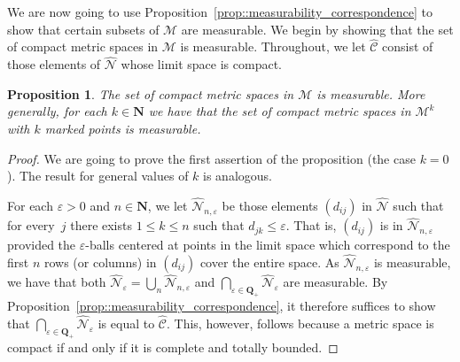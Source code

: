 \documentclass[10pt]{amsart}
\let\mathcal\mathscr
\let\epsilon\varepsilon
\theoremstyle{plain}
\numberwithin{theorem}{section}
\newtheorem{proposition}[theorem]{Proposition}
\theoremstyle{definition}
\newcommand\mmspace{{\mathcal M}}
\newcommand{\matrixmspace}{\mathcal N}
\newcommand{\compactmatrix}{\mathcal C}
\newcommand{\N}{\mathbf{N}}
\newcommand{\Q}{{\mathbf Q}}
\let\wh\widehat
\begin{document}
We are now going to use Proposition~\ref{prop::measurability_correspondence} to show that certain subsets of $\mmspace$ are measurable. We begin by showing that the set of compact metric spaces in $\mmspace$ is measurable. Throughout, we let $\wh{\compactmatrix}$ consist of those elements of $\wh{\matrixmspace}$ whose limit space is compact.

\begin{proposition}
\label{prop::compact_measurable}
The set of compact metric spaces in $\mmspace$ is measurable. More generally, for each $k \in \N$ we have that the set of compact metric spaces in $\mmspace^k$ with $k$ marked points is measurable.
\end{proposition}
\begin{proof}
We are going to prove the first assertion of the proposition (\ie the case $k=0$). The result for general values of $k$ is analogous.

For each $\epsilon > 0$ and $n \in \N$, we let $\wh{\matrixmspace}_{n,\epsilon}$ be those elements $(d_{ij})$ in $\wh{\matrixmspace}$ such that for every~$j$ there exists $1 \leq k \leq n$ such that $d_{jk} \leq \epsilon$. That is, $(d_{ij})$ is in $\wh{\matrixmspace}_{n,\epsilon}$ provided the $\epsilon$-balls centered at points in the limit space which correspond to the first $n$ rows (or columns) in $(d_{ij})$ cover the entire space. As $\wh{\matrixmspace}_{n,\epsilon}$ is measurable, we have that both $\wh{\matrixmspace}_\epsilon = \bigcup_n \wh{\matrixmspace}_{n,\epsilon}$ and $\bigcap_{\epsilon \in \Q_+} \wh{\matrixmspace}_\epsilon$ are measurable. By Proposition~\ref{prop::measurability_correspondence}, it therefore suffices to show that $\bigcap_{\epsilon \in \Q_+} \wh{\matrixmspace}_\epsilon$ is equal to $\wh{\compactmatrix}$. This, however, follows because a metric space is compact if and only if it is complete and totally bounded.
\end{proof}
\end{document}
